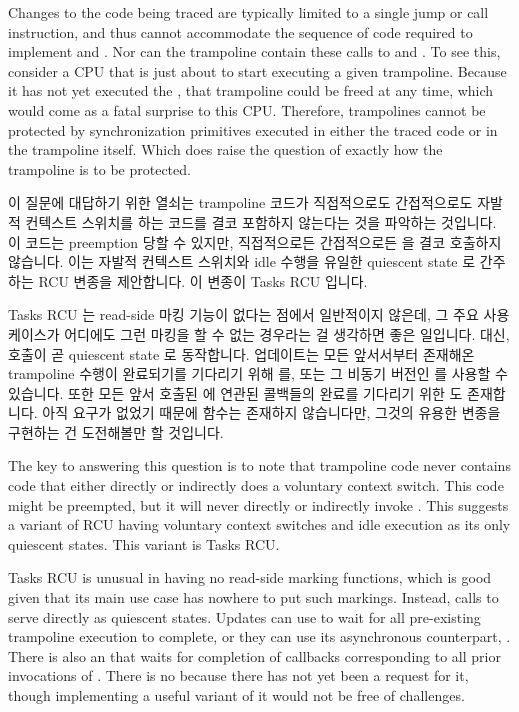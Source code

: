 Changes to the code being traced are typically limited to a single jump
or call instruction, and thus cannot accommodate the sequence of code
required to implement  and .
Nor can the trampoline contain these calls to  and
.
To see this, consider a CPU that is just about to start executing a
given trampoline.
Because it has not yet executed the , that
trampoline could be freed at any time, which would come as a fatal
surprise to this CPU\@.
Therefore, trampolines cannot be protected by synchronization primitives
executed in either the traced code or in the trampoline itself.
Which does raise the question of exactly how the trampoline is to be
protected.

\fi

이 질문에 대답하기 위한 열쇠는 trampoline 코드가 직접적으로도 간접적으로도
자발적 컨텍스트 스위치를 하는 코드를 결코 포함하지 않는다는 것을 파악하는
것입니다.
이 코드는 preemption 당할 수 있지만, 직접적으로든 간접적으로든 
을 결코 호출하지 않습니다.
이는 자발적 컨텍스트 스위치와 idle 수행을 유일한 quiescent state 로 간주하는
RCU 변종을 제안합니다.
이 변종이 Tasks RCU 입니다.

Tasks RCU 는 read-side 마킹 기능이 없다는 점에서 일반적이지 않은데, 그 주요
사용 케이스가 어디에도 그런 마킹을 할 수 없는 경우라는 걸 생각하면 좋은
일입니다.
대신,  호출이 곧 quiescent state 로 동작합니다.
업데이트는 모든 앞서서부터 존재해온 trampoline 수행이 완료되기를 기다리기 위해
 를, 또는 그 비동기 버전인  를
사용할 수 있습니다.
또한 모든 앞서 호출된  에 연관된 콜백들의 완료를 기다리기
위한  도 존재합니다.
아직 요구가 없었기 때문에  함수는
존재하지 않습니다만, 그것의 유용한 변종을 구현하는 건 도전해볼만 할 것입니다.

\iffalse

The key to answering this question is to note that trampoline code
never contains code that either directly or indirectly does a
voluntary context switch.
This code might be preempted, but it will never directly or indirectly
invoke .
This suggests a variant of RCU having voluntary context switches and
idle execution as its only quiescent states.
This variant is Tasks RCU\@.

Tasks RCU is unusual in having no read-side marking functions, which
is good given that its main use case has nowhere to put such markings.
Instead, calls to  serve directly as quiescent states.
Updates can use  to wait for all pre-existing
trampoline execution to complete, or they can use its asynchronous
counterpart, .
There is also an  that waits for completion
of callbacks corresponding to all prior invocations of .
There is no  because there has
not yet been a request for it, though implementing a useful variant of
it would not be free of challenges.

